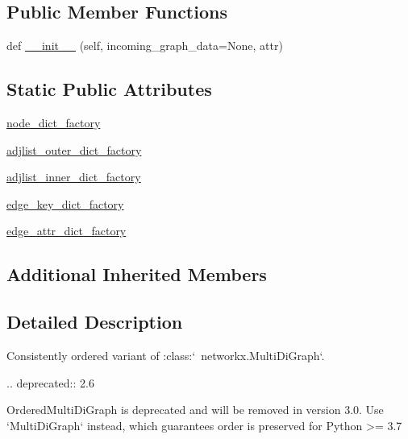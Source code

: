 \subsection*{Public Member Functions}
\begin{DoxyCompactItemize}
\item 
def \hyperlink{classnetworkx_1_1classes_1_1ordered_1_1OrderedMultiDiGraph_a1670572500f0569b3cc1885e9c542c32}{\+\_\+\+\_\+init\+\_\+\+\_\+} (self, incoming\+\_\+graph\+\_\+data=None, attr)
\end{DoxyCompactItemize}
\subsection*{Static Public Attributes}
\begin{DoxyCompactItemize}
\item 
\hyperlink{classnetworkx_1_1classes_1_1ordered_1_1OrderedMultiDiGraph_a7922499c9b302951d44ca4895048bac9}{node\+\_\+dict\+\_\+factory}
\item 
\hyperlink{classnetworkx_1_1classes_1_1ordered_1_1OrderedMultiDiGraph_ab63bf529694db34dc86881571c5a906b}{adjlist\+\_\+outer\+\_\+dict\+\_\+factory}
\item 
\hyperlink{classnetworkx_1_1classes_1_1ordered_1_1OrderedMultiDiGraph_a928ae5cc264f5eb843df97624aada960}{adjlist\+\_\+inner\+\_\+dict\+\_\+factory}
\item 
\hyperlink{classnetworkx_1_1classes_1_1ordered_1_1OrderedMultiDiGraph_a6939c161a12206c122d70538135e66b4}{edge\+\_\+key\+\_\+dict\+\_\+factory}
\item 
\hyperlink{classnetworkx_1_1classes_1_1ordered_1_1OrderedMultiDiGraph_a4a8173fe4c4b341fa0cc58cc541eaf42}{edge\+\_\+attr\+\_\+dict\+\_\+factory}
\end{DoxyCompactItemize}
\subsection*{Additional Inherited Members}


\subsection{Detailed Description}
\begin{DoxyVerb}Consistently ordered variant of :class:`~networkx.MultiDiGraph`.

.. deprecated:: 2.6

   OrderedMultiDiGraph is deprecated and will be removed in version 3.0.
   Use `MultiDiGraph` instead, which guarantees order is preserved for
   Python >= 3.7
\end{DoxyVerb}
 


